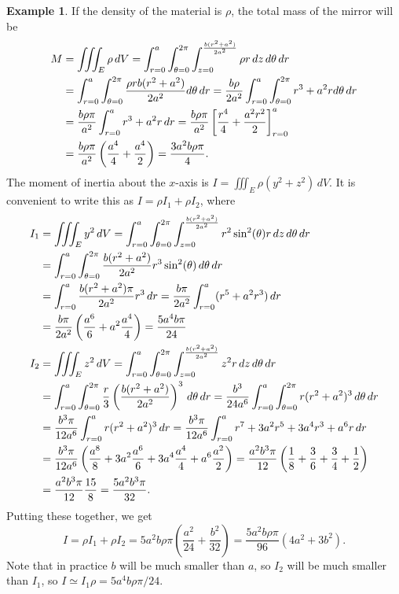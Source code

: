 \documentclass[reqno]{amsart}
\theoremstyle{definition}
\newtheorem{example}[theorem]{Example}
\begin{document}
\begin{example}
 If the density of the material is $\rho$, the total mass of the
 mirror will be 
 \begin{align*}
  M &= \iiint_E \rho\,dV 
     = \int_{r=0}^a \int_{\azi=0}^{2\pi}
        \int_{z=0}^{\frac{b(r^2+a^2)}{2a^2}} \rho r\,dz\,d\azi\,dr \\
    &= \int_{r=0}^a \int_{\azi=0}^{2\pi} \frac{\rho r b (r^2+a^2)}{2a^2}
        d\azi\,dr 
     = \frac{b\rho}{2a^2} \int_{r=0}^a \int_{\azi=0}^{2\pi} r^3+a^2r
        d\azi\,dr \\
    &= \frac{b\rho\pi}{a^2} \int_{r=0}^a r^3+a^2r\,dr 
     = \frac{b\rho\pi}{a^2} \CH{\frac{r^4}{4}+\frac{a^2r^2}{2}}_{r=0}^a \\
    &= \frac{b\rho\pi}{a^2} \left(\frac{a^4}{4}+\frac{a^4}{2}\right) 
     = \frac{3a^2b\rho\pi}{4}.
 \end{align*}
 The moment of inertia about the $x$-axis is
 $I=\iiint_E\rho(y^2+z^2)\,dV$.  It is convenient to write this as
 $I=\rho I_1+\rho I_2$, where
 \begin{align*}
  I_1 &= \iiint_E y^2\,dV = 
   \int_{r=0}^a \int_{\theta=0}^{2\pi}
    \int_{z=0}^{\frac{b(r^2+a^2)}{2a^2}} r^2\sin^2(\theta)r\,dz\,d\theta\,dr \\
   &= \int_{r=0}^a \int_{\theta=0}^{2\pi}
    \frac{b(r^2+a^2)}{2a^2} r^3\sin^2(\theta)\,d\theta\,dr \\
   &= \int_{r=0}^a \frac{b(r^2+a^2)\pi}{2a^2} r^3\,dr 
    = \frac{b\pi}{2a^2}\int_{r=0}^a (r^5+a^2r^3)\,dr \\
   &= \frac{b\pi}{2a^2}\left(\frac{a^6}{6}+a^2\frac{a^4}{4}\right)
    = \frac{5a^4b\pi}{24} \\
  I_2 &= \iiint_E z^2\,dV = 
   \int_{r=0}^a \int_{\theta=0}^{2\pi}
    \int_{z=0}^{\frac{b(r^2+a^2)}{2a^2}} z^2r\,dz\,d\theta\,dr \\
   &= \int_{r=0}^a \int_{\theta=0}^{2\pi}
     \frac{r}{3}\left(\frac{b(r^2+a^2)}{2a^2}\right)^3 \,d\theta\,dr 
    = \frac{b^3}{24a^6} \int_{r=0}^a\int_{\theta=0}^{2\pi}
       r(r^2+a^2)^3 \,d\theta\,dr \\
   &= \frac{b^3\pi}{12a^6} \int_{r=0}^a r(r^2+a^2)^3\,dr 
    = \frac{b^3\pi}{12a^6} \int_{r=0}^a r^7+3a^2r^5+3a^4r^3+a^6r\,dr \\
   &= \frac{b^3\pi}{12a^6}
       \left(\frac{a^8}{8}+3a^2\frac{a^6}{6}+3a^4\frac{a^4}{4}+a^6\frac{a^2}{2}\right)
    = \frac{a^2b^3\pi}{12}\left(\frac{1}{8}+\frac{3}{6}+\frac{3}{4}+\frac{1}{2}\right)\\
   &= \frac{a^2b^3\pi}{12} \frac{15}{8} = \frac{5a^2b^3\pi}{32}.
 \end{align*}
 Putting these together, we get
 \[ I = \rho I_1 + \rho I_2 
      = 5a^2b\rho\pi\left(\frac{a^2}{24}+\frac{b^2}{32}\right)
      = \frac{5a^2b\rho\pi}{96}(4a^2+3b^2).
 \]
 Note that in practice $b$ will be much smaller than $a$, so $I_2$
 will be much smaller than $I_1$, so $I\simeq I_1\rho=5a^4b\rho\pi/24$.
\end{example}
\end{document}

